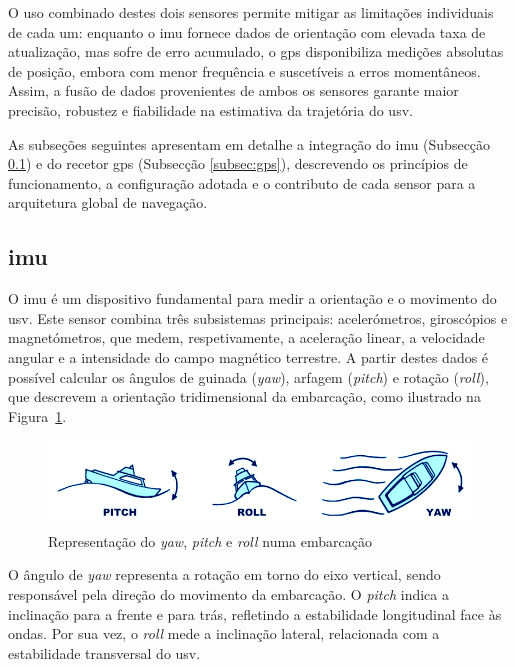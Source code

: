 O uso combinado destes dois sensores permite mitigar as limitações individuais de cada um: enquanto o \gls{imu} fornece dados de orientação com elevada taxa de atualização, mas sofre de erro acumulado, o \gls{gps} disponibiliza medições absolutas de posição, embora com menor frequência e suscetíveis a erros momentâneos. Assim, a fusão de dados provenientes de ambos os sensores garante maior precisão, robustez e fiabilidade na estimativa da trajetória do \gls{usv}.  

As subseções seguintes apresentam em detalhe a integração do \acrfull{imu} (Subsecção \ref{subsec:imu}) e do recetor \acrfull{gps} (Subsecção \ref{subsec:gps}), descrevendo os princípios de funcionamento, a configuração adotada e o contributo de cada sensor para a arquitetura global de navegação.


\subsection{\acrfull{imu}} \label{subsec:imu}

O \gls{imu} é um dispositivo fundamental para medir a orientação e o movimento do \gls{usv}. Este sensor combina três subsistemas principais: acelerómetros, giroscópios e magnetómetros, que medem, respetivamente, a aceleração linear, a velocidade angular e a intensidade do campo magnético terrestre. A partir destes dados é possível calcular os ângulos de guinada (\emph{yaw}), arfagem (\emph{pitch}) e rotação (\emph{roll}), que descrevem a orientação tridimensional da embarcação, como ilustrado na Figura~\ref{fig:pitch-roll-yaw}.

\begin{figure}[H]
    \centering
    \includegraphics[height=0.2\linewidth]{figuras/Pitch-Roll-Yaw.png}
    \caption[Representação do \emph{yaw}, \emph{pitch} e \emph{roll} numa embarcação]{Representação do \emph{yaw}, \emph{pitch} e \emph{roll} numa embarcação \cite{imagem-yaw-pitch-roll}}
    \label{fig:pitch-roll-yaw}
\end{figure}

O ângulo de \emph{yaw} representa a rotação em torno do eixo vertical, sendo responsável pela direção do movimento da embarcação. O \emph{pitch} indica a inclinação para a frente e para trás, refletindo a estabilidade longitudinal face às ondas. Por sua vez, o \emph{roll} mede a inclinação lateral, relacionada com a estabilidade transversal do \gls{usv}.

